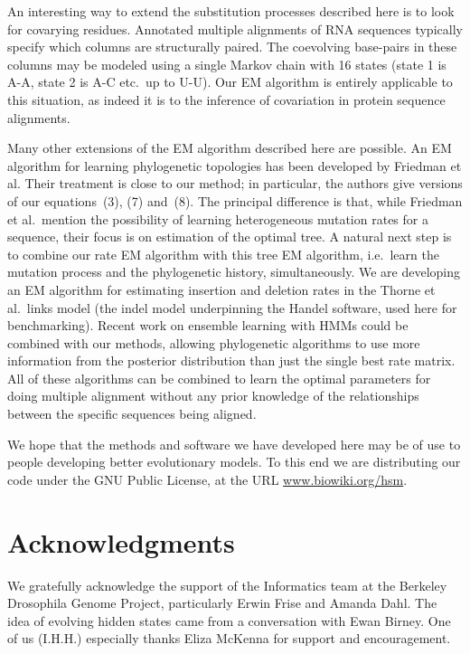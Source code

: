 \documentclass[12pt]{article}
\begin{document}
An interesting way to extend the substitution processes described here is to look for covarying
residues. Annotated multiple alignments of RNA sequences typically specify which columns are
structurally paired. The coevolving base-pairs in these columns may be modeled using a single Markov
chain with 16 states (state 1 is A-A, state 2 is A-C etc.\ up to U-U).\cite{Knudsen1999} Our EM
algorithm is entirely applicable to this situation, as indeed it is to the inference of covariation
in protein sequence alignments.

Many other extensions of the EM algorithm described here are possible. An EM algorithm for learning
phylogenetic topologies has been developed by Friedman et al.\cite{Friedman2001} Their treatment is
close to our method; in particular, the authors give versions of our equations~(3), (7) and~(8). The
principal difference is that, while Friedman et al.\ mention the possibility of learning
heterogeneous mutation rates for a sequence, their focus is on estimation of the optimal tree. A
natural next step is to combine our rate EM algorithm with this tree EM algorithm, i.e.\ learn the
mutation process and the phylogenetic history, simultaneously. We are developing an EM algorithm for
estimating insertion and deletion rates in the Thorne et al.\ links model\cite{Thorne1991} (the
indel model underpinning the Handel software, used here for benchmarking\cite{Holmes2001}). Recent
work on ensemble learning with HMMs could be combined with our methods, allowing phylogenetic
algorithms to use more information from the posterior distribution than just the single best rate
matrix. All of these algorithms can be combined to learn the optimal parameters for doing multiple
alignment without any prior knowledge of the relationships between the specific sequences being
aligned.

We hope that the methods and software we have developed here may be of use to people developing
better evolutionary models. To this end we are distributing our code under the GNU Public License, at
the URL \url{www.biowiki.org/hsm}.


\section*{Acknowledgments}

We gratefully acknowledge the support of the Informatics team at the Berkeley Drosophila Genome
Project, particularly Erwin Frise and Amanda Dahl. The idea of evolving hidden states came from a
conversation with Ewan Birney. One of us (I.H.H.) especially thanks Eliza McKenna for support and
encouragement.
\end{document}
